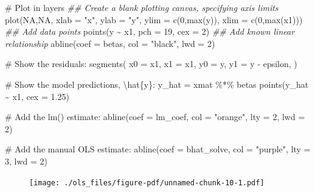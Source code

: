 \documentclass[
  letterpaper,
  DIV=11,
  numbers=noendperiod]{scrreprt}
\newenvironment{Shaded}{\begin{snugshade}}{\end{snugshade}}
\newcommand{\AttributeTok}[1]{\textcolor[rgb]{0.40,0.45,0.13}{#1}}
\newcommand{\CommentTok}[1]{\textcolor[rgb]{0.37,0.37,0.37}{#1}}
\newcommand{\ConstantTok}[1]{\textcolor[rgb]{0.56,0.35,0.01}{#1}}
\newcommand{\DecValTok}[1]{\textcolor[rgb]{0.68,0.00,0.00}{#1}}
\newcommand{\DocumentationTok}[1]{\textcolor[rgb]{0.37,0.37,0.37}{\textit{#1}}}
\newcommand{\FloatTok}[1]{\textcolor[rgb]{0.68,0.00,0.00}{#1}}
\newcommand{\FunctionTok}[1]{\textcolor[rgb]{0.28,0.35,0.67}{#1}}
\newcommand{\NormalTok}[1]{\textcolor[rgb]{0.00,0.23,0.31}{#1}}
\newcommand{\OtherTok}[1]{\textcolor[rgb]{0.00,0.23,0.31}{#1}}
\newcommand{\SpecialCharTok}[1]{\textcolor[rgb]{0.37,0.37,0.37}{#1}}
\newcommand{\StringTok}[1]{\textcolor[rgb]{0.13,0.47,0.30}{#1}}
\begin{document}
\begin{Shaded}
\begin{Highlighting}[]
\CommentTok{\# Plot in layers}
\DocumentationTok{\#\# Create a blank plotting canvas, specifying axis limits}
\FunctionTok{plot}\NormalTok{(}\ConstantTok{NA}\NormalTok{,}\ConstantTok{NA}\NormalTok{,}
     \AttributeTok{xlab =} \StringTok{"x"}\NormalTok{, }\AttributeTok{ylab =} \StringTok{"y"}\NormalTok{,}
     \AttributeTok{ylim =} \FunctionTok{c}\NormalTok{(}\DecValTok{0}\NormalTok{,}\FunctionTok{max}\NormalTok{(y)),}
     \AttributeTok{xlim =} \FunctionTok{c}\NormalTok{(}\DecValTok{0}\NormalTok{,}\FunctionTok{max}\NormalTok{(x1)))}
\DocumentationTok{\#\# Add data points}
\FunctionTok{points}\NormalTok{(y }\SpecialCharTok{\textasciitilde{}}\NormalTok{ x1, }\AttributeTok{pch =} \DecValTok{19}\NormalTok{, }\AttributeTok{cex =} \DecValTok{2}\NormalTok{)}
\DocumentationTok{\#\# Add known linear relationship}
\FunctionTok{abline}\NormalTok{(}\AttributeTok{coef =}\NormalTok{ betas,}
       \AttributeTok{col =} \StringTok{"black"}\NormalTok{, }\AttributeTok{lwd =} \DecValTok{2}\NormalTok{)}

\CommentTok{\# Show the residuals:}
\FunctionTok{segments}\NormalTok{(}
  \AttributeTok{x0 =}\NormalTok{ x1,}
  \AttributeTok{x1 =}\NormalTok{ x1,}
  \AttributeTok{y0 =}\NormalTok{ y,}
  \AttributeTok{y1 =}\NormalTok{ y }\SpecialCharTok{{-}}\NormalTok{ epsilon,}
\NormalTok{)}

\CommentTok{\# Show the model predictions, \textbackslash{}hat\{y\}:}
\NormalTok{y\_hat }\OtherTok{=}\NormalTok{ xmat }\SpecialCharTok{\%*\%}\NormalTok{ betas}
\FunctionTok{points}\NormalTok{(y\_hat }\SpecialCharTok{\textasciitilde{}}\NormalTok{ x1,}
       \AttributeTok{cex =} \FloatTok{1.25}\NormalTok{)}

\CommentTok{\# Add the lm() estimate:}
\FunctionTok{abline}\NormalTok{(}\AttributeTok{coef =}\NormalTok{ lm\_coef,}
       \AttributeTok{col =} \StringTok{"orange"}\NormalTok{, }\AttributeTok{lty =} \DecValTok{2}\NormalTok{, }\AttributeTok{lwd =} \DecValTok{2}\NormalTok{)}

\CommentTok{\# Add the manual OLS estimate:}
\FunctionTok{abline}\NormalTok{(}\AttributeTok{coef =}\NormalTok{ bhat\_solve,}
       \AttributeTok{col =} \StringTok{"purple"}\NormalTok{, }\AttributeTok{lty =} \DecValTok{3}\NormalTok{, }\AttributeTok{lwd =} \DecValTok{2}\NormalTok{)}
\end{Highlighting}
\end{Shaded}

\begin{figure}[H]

{\centering \texttt{[image: ./ols\_files/figure-pdf/unnamed-chunk-10-1.pdf]}

}

\end{figure}
\end{document}
